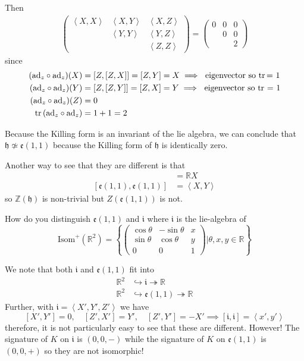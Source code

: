 \documentclass[12pt]{article}
\newcommand{\R}{\mathbb{R}}
\newcommand{\Z}{\mathbb{Z}}
\newcommand{\brak}[1]{\left\langle #1 \right\rangle}
\newcommand{\tr}{\text{tr}\,}
\newcommand{\h}{\mathfrak{h}}
\newcommand{\ad}{\text{ad}}
\begin{document}
    Then 
    \begin{align*}
        \begin{pmatrix}
            \brak{X, X} & \brak{X, Y} & \brak{X, Z}\\
            & \brak{Y, Y} & \brak{Y, Z}\\
            & & \brak{Z, Z}
        \end{pmatrix} = \begin{pmatrix}
            0 & 0 & 0\\ 
            & 0 & 0\\ 
            & & 2
        \end{pmatrix}
    \end{align*}
    since 
    \begin{align*}
        (\ad_z \circ \ad_z)(X) &= [Z, [Z, X]] = [Z, Y] = X \implies \text{ eigenvector so \tr = 1}\\ 
        (\ad_z \circ \ad_z)(Y) &= [Z, [Z, Y]] = [Z, X] = Y \implies \text{ eigenvector so tr = 1}\\ 
        (\ad_z \circ \ad_z)(Z) &= 0\\ 
        \tr(\ad_z \circ \ad_z) &= 1 + 1 = 2
    \end{align*}

    Because the Killing form is an invariant of the lie algebra, we can conclude that $\h \not\simeq \mathfrak{e}(1, 1)$ because the Killing form of $\h$ is identically zero.

    Another way to see that they are different is that 
    \begin{align*}
        [\h, \h] &= \R X\\ 
        [\mathfrak{e}(1, 1), \mathfrak{e}(1, 1)] &= \brak{X, Y}
    \end{align*}
    so $\Z(\h)$ is non-trivial but $Z(\mathfrak{e}(1, 1))$ is not. 

    How do you distinguish $\mathfrak{e}(1, 1)$ and $\mathfrak{i}$ where $\mathfrak{i}$ is the lie-algebra of 
    \[\text{Isom}^+(\R^2) = \left\{\begin{pmatrix}
        \cos \theta & -\sin \theta & x\\ 
        \sin \theta & \cos \theta & y\\
        0 & 0 & 1
    \end{pmatrix} \bigg\vert \theta, x, y \in \R\right\}\]

    We note that both $\mathfrak{i}$ and $\mathfrak{e}(1, 1)$ fit into 
    \begin{align*}
        \R^2 &\hookrightarrow \mathfrak{i} \twoheadrightarrow \R\\ 
        \R^2 &\hookrightarrow \mathfrak{e}(1, 1) \twoheadrightarrow \R
    \end{align*}
    Further, with $\mathfrak{i} = \brak{X', Y', Z'}$ we have 
    \[[X', Y'] = 0, \quad [Z', X'] = Y', \quad [Z', Y'] = -X' \implies [\mathfrak{i}, \mathfrak{i}] = \brak{x', y'}\]
    therefore, it is not particularly easy to see that these are different. However! The signature of $K$ on $\mathfrak{i}$ is $(0, 0, -)$ while the signature of $K$ on $\mathfrak{e}(1, 1)$ is $(0, 0, +)$ so they are not isomorphic! 
\end{document}
